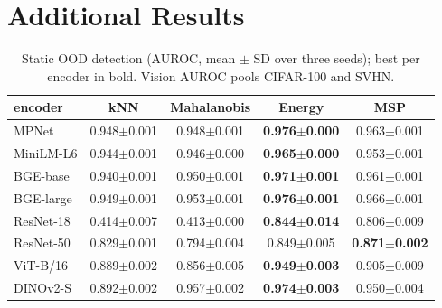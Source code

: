 \documentclass[twoside]{article}
\theoremstyle{definition}
\theoremstyle{remark}
\begin{document}
\section{Additional Results}\label{app:extra}

\begin{table}[!htbp]
\centering
\small
\caption{Static OOD detection (AUROC, mean $\pm$ SD over three seeds); best per encoder in bold.
Vision AUROC pools CIFAR-100 and SVHN.}
\label{tab:static}
\begin{tabular}{lcccc}
\toprule
encoder & kNN & Mahalanobis & Energy & MSP \\
\midrule
MPNet & 0.948$\pm$0.001 & 0.948$\pm$0.001 & \textbf{0.976$\pm$0.000} & 0.963$\pm$0.001 \\
MiniLM-L6 & 0.944$\pm$0.001 & 0.946$\pm$0.000 & \textbf{0.965$\pm$0.000} & 0.953$\pm$0.001 \\
BGE-base & 0.940$\pm$0.001 & 0.950$\pm$0.001 & \textbf{0.971$\pm$0.001} & 0.961$\pm$0.001 \\
BGE-large & 0.949$\pm$0.001 & 0.953$\pm$0.001 & \textbf{0.976$\pm$0.001} & 0.966$\pm$0.001 \\
\midrule
ResNet-18 & 0.414$\pm$0.007 & 0.413$\pm$0.000 & \textbf{0.844$\pm$0.014} & 0.806$\pm$0.009 \\
ResNet-50 & 0.829$\pm$0.001 & 0.794$\pm$0.004 & 0.849$\pm$0.005 & \textbf{0.871$\pm$0.002} \\
ViT-B/16 & 0.889$\pm$0.002 & 0.856$\pm$0.005 & \textbf{0.949$\pm$0.003} & 0.905$\pm$0.009 \\
DINOv2-S & 0.892$\pm$0.002 & 0.957$\pm$0.002 & \textbf{0.974$\pm$0.003} & 0.950$\pm$0.004 \\
\bottomrule
\end{tabular}
\end{table}
\end{document}
